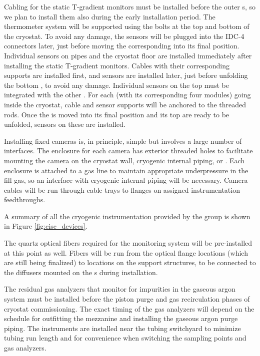 Cabling for the static T-gradient monitors must be installed before the outer s, so we plan to install them also during the early installation period. The thermometer system will be supported using the bolts at the top and bottom of the cryostat. To avoid any damage, the sensors will be plugged into the IDC-4 connectors later, just before moving the corresponding  into its final position. Individual sensors on pipes and the cryostat floor are installed immediately after installing the static T-gradient monitors. Cables with their corresponding supports are installed first, and sensors are installed later, just before unfolding the bottom , to avoid any damage. Individual sensors on the top  must be integrated with the other . For each  (with its corresponding four  modules) going inside the cryostat, cable and sensor supports will be anchored to the  threaded rods. Once the  is moved into its final position and its top  are ready to be unfolded, sensors on these  are installed.

Installing fixed cameras is, in principle, simple but involves a large number of interfaces. The enclosure for each camera has exterior threaded holes to facilitate mounting the camera on the cryostat wall, cryogenic internal piping, or . Each enclosure is attached to a gas line to maintain appropriate underpressure in the fill gas, so an interface with cryogenic internal piping will be necessary. Camera cables will be run through cable trays to flanges on assigned instrumentation feedthroughs. 

A summary of all the cryogenic instrumentation provided by the  group is shown in Figure \ref{fig:cisc_devices}. 

The quartz optical fibers required for the  monitoring system will be pre-installed at this point as well.  Fibers will be run from the optical flange locations (which are still being finalized) to locations on the  support structures, to be connected to the diffusers mounted on the s during installation.

The residual gas analyzers that monitor for impurities in the gaseous argon system must be installed before the piston purge and gas recirculation phases of cryostat commissioning. The exact timing of the gas analyzers will depend on the schedule for outfitting the mezzanine and installing the gaseous argon purge piping. The instruments are installed near the tubing switchyard to minimize tubing run length and for convenience when switching the sampling points and gas analyzers. 

